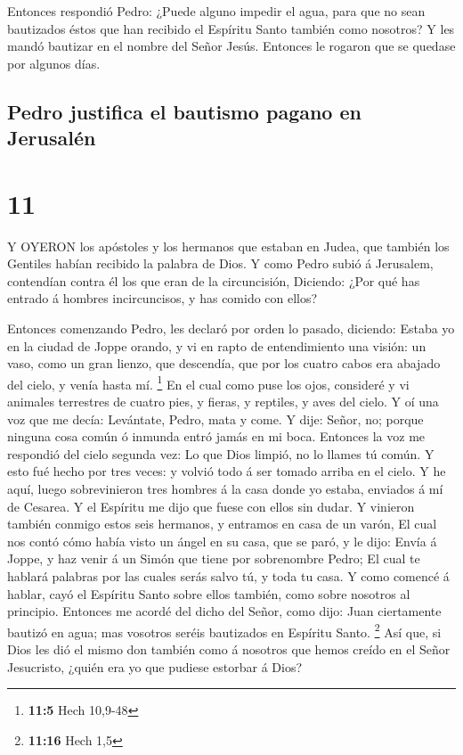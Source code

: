  Entonces respondió Pedro: ¿Puede alguno impedir el agua,
para que no sean bautizados éstos que han recibido el Espíritu Santo
también como nosotros?  Y les mandó bautizar en el nombre
del Señor Jesús. Entonces le rogaron que se quedase por algunos días.

\hypertarget{pedro-justifica-el-bautismo-pagano-en-jerusaluxe9n}{%
\subsection{Pedro justifica el bautismo pagano en
Jerusalén}\label{pedro-justifica-el-bautismo-pagano-en-jerusaluxe9n}}

\hypertarget{section-10}{%
\section{11}\label{section-10}}

 Y OYERON los apóstoles y los hermanos que estaban en Judea,
que también los Gentiles habían recibido la palabra de Dios.
 Y como Pedro subió á Jerusalem, contendían contra él los
que eran de la circuncisión,  Diciendo: ¿Por qué has entrado
á hombres incircuncisos, y has comido con ellos?

 Entonces comenzando Pedro, les declaró por orden lo pasado,
diciendo:  Estaba yo en la ciudad de Joppe orando, y vi en
rapto de entendimiento una visión: un vaso, como un gran lienzo, que
descendía, que por los cuatro cabos era abajado del cielo, y venía hasta
mí. \footnote{\textbf{11:5} Hech 10,9-48}  En el cual como
puse los ojos, consideré y vi animales terrestres de cuatro pies, y
fieras, y reptiles, y aves del cielo.  Y oí una voz que me
decía: Levántate, Pedro, mata y come.  Y dije: Señor, no;
porque ninguna cosa común ó inmunda entró jamás en mi boca. 
Entonces la voz me respondió del cielo segunda vez: Lo que Dios limpió,
no lo llames tú común.  Y esto fué hecho por tres veces: y
volvió todo á ser tomado arriba en el cielo.  Y he aquí,
luego sobrevinieron tres hombres á la casa donde yo estaba, enviados á
mí de Cesarea.  Y el Espíritu me dijo que fuese con ellos
sin dudar. Y vinieron también conmigo estos seis hermanos, y entramos en
casa de un varón,  El cual nos contó cómo había visto un
ángel en su casa, que se paró, y le dijo: Envía á Joppe, y haz venir á
un Simón que tiene por sobrenombre Pedro;  El cual te
hablará palabras por las cuales serás salvo tú, y toda tu casa.
 Y como comencé á hablar, cayó el Espíritu Santo sobre
ellos también, como sobre nosotros al principio.  Entonces
me acordé del dicho del Señor, como dijo: Juan ciertamente bautizó en
agua; mas vosotros seréis bautizados en Espíritu Santo. \footnote{\textbf{11:16}
  Hech 1,5}  Así que, si Dios les dió el mismo don también
como á nosotros que hemos creído en el Señor Jesucristo, ¿quién era yo
que pudiese estorbar á Dios?

